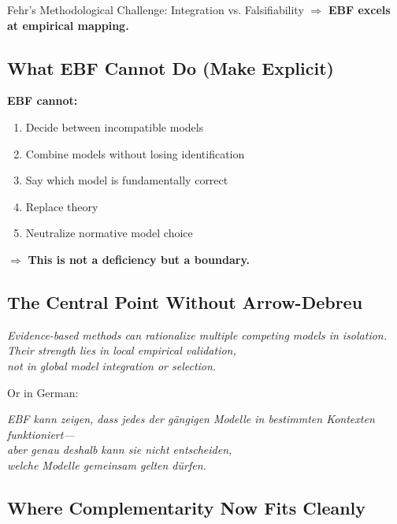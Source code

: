 \begin{chapter}{Fehr's Methodological Challenge: Integration vs. Falsifiability}
$\Rightarrow$ \textbf{EBF excels at empirical mapping.}

\subsection{What EBF Cannot Do (Make Explicit)}

\textbf{EBF cannot:}
\begin{enumerate}[noitemsep]
    \item Decide between incompatible models
    \item Combine models without losing identification
    \item Say which model is fundamentally correct
    \item Replace theory
    \item Neutralize normative model choice
\end{enumerate}

$\Rightarrow$ \textbf{This is not a deficiency but a boundary.}

\subsection{The Central Point Without Arrow-Debreu}

\begin{tcolorbox}[colback=blue!5!white,colframe=blue!75!black,title=\textbf{The Formulation (AD-Free)}]
\begin{center}
\large
\textit{Evidence-based methods can rationalize multiple competing models in isolation.\\
Their strength lies in local empirical validation,\\
not in global model integration or selection.}
\end{center}

\vspace{0.5em}
Or in German:

\begin{center}
\textit{EBF kann zeigen, dass jedes der gängigen Modelle in bestimmten Kontexten funktioniert---\\
aber genau deshalb kann sie nicht entscheiden,\\
welche Modelle gemeinsam gelten dürfen.}
\end{center}
\end{tcolorbox}

\subsection{Where Complementarity Now Fits Cleanly}


\end{chapter}
